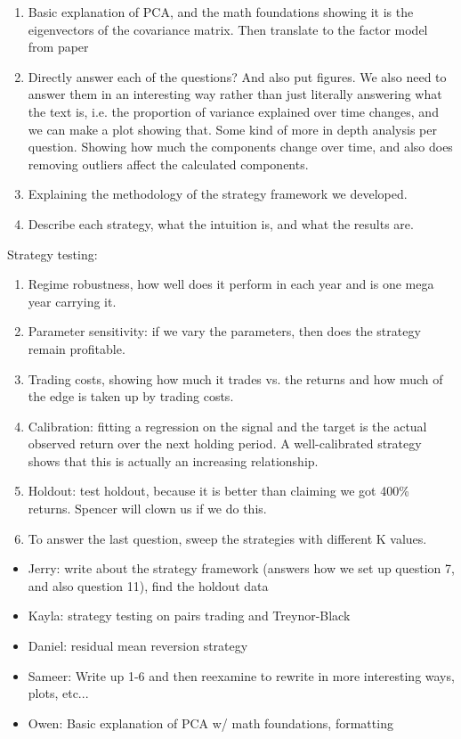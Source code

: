\documentclass[12pt,letterpaper]{article}
\begin{document}
\begin{enumerate}
    \item Basic explanation of PCA, and the math foundations showing it is the eigenvectors of the covariance matrix. Then translate to the factor model from paper
    \item Directly answer each of the questions? And also put figures. We also need to answer them in an interesting way rather than just literally answering what the text is, i.e. the proportion of variance explained over time changes, and we can make a plot showing that. Some kind of more in depth analysis per question. Showing how much the components change over time, and also does removing outliers affect the calculated components.
    \item Explaining the methodology of the strategy framework we developed.
    \item Describe each strategy, what the intuition is, and what the results are.
\end{enumerate}

Strategy testing:
\begin{enumerate}
    \item Regime robustness, how well does it perform in each year and is one mega year carrying it.
    \item Parameter sensitivity: if we vary the parameters, then does the strategy remain profitable.
    \item Trading costs, showing how much it trades vs. the returns and how much of the edge is taken up by trading costs.
    \item Calibration: fitting a regression on the signal and the target is the actual observed return over the next holding period. A well-calibrated strategy shows that this is actually an increasing relationship.
    \item Holdout: test holdout, because it is better than claiming we got 400\% returns. Spencer will clown us if we do this.
    \item To answer the last question, sweep the strategies with different K values.
\end{enumerate}

\begin{itemize}
    \item Jerry: write about the strategy framework (answers how we set up question 7, and also question 11), find the holdout data
    \item Kayla: strategy testing on pairs trading and Treynor-Black
    \item Daniel: residual mean reversion strategy 
    \item Sameer: Write up 1-6 and then reexamine to rewrite in more interesting ways, plots, etc...
    \item Owen: Basic explanation of PCA w/ math foundations, formatting
\end{itemize}
\newpage
\end{document}
